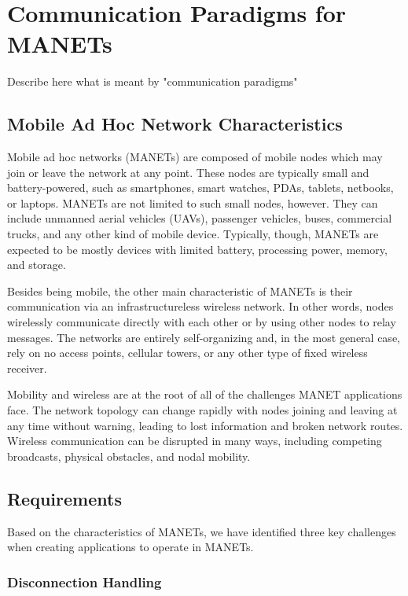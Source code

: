 \chapter{Communication Paradigms for MANETs}

Describe here what is meant by "communication paradigms"

\section{Mobile Ad Hoc Network Characteristics}

Mobile ad hoc networks (MANETs) are composed of mobile nodes which may join or leave the network at any point. These nodes are typically small and battery-powered, such as smartphones, smart watches, PDAs, tablets, netbooks, or laptops. MANETs are not limited to such small nodes, however. They can include unmanned aerial vehicles (UAVs), passenger vehicles, buses, commercial trucks, and any other kind of mobile device. Typically, though, MANETs are expected to be mostly devices with limited battery, processing power, memory, and storage.

Besides being mobile, the other main characteristic of MANETs is their communication via an infrastructureless wireless network. In other words, nodes wirelessly communicate directly with each other or by using other nodes to relay messages. The networks are entirely self-organizing and, in the most general case, rely on no access points, cellular towers, or any other type of fixed wireless receiver.

Mobility and wireless are at the root of all of the challenges MANET applications face. The network topology can change rapidly with nodes joining and leaving at any time without warning, leading to lost information and broken network routes. Wireless communication can be disrupted in many ways, including competing broadcasts, physical obstacles, and nodal mobility.

\section{Requirements}\label{sec:manetrecs}

Based on the characteristics of MANETs, we have identified three key challenges when creating applications to operate in MANETs.

\subsection{Disconnection Handling}

